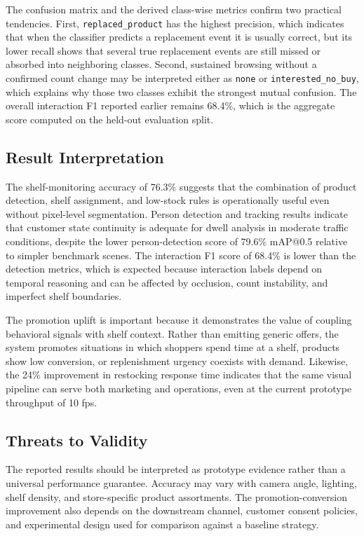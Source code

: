 \documentclass[conference]{IEEEtran}
\begin{document}
The confusion matrix and the derived class-wise metrics confirm two practical tendencies. First, \texttt{replaced\_product} has the highest precision, which indicates that when the classifier predicts a replacement event it is usually correct, but its lower recall shows that several true replacement events are still missed or absorbed into neighboring classes. Second, sustained browsing without a confirmed count change may be interpreted either as \texttt{none} or \texttt{interested\_no\_buy}, which explains why those two classes exhibit the strongest mutual confusion. The overall interaction F1 reported earlier remains 68.4\%, which is the aggregate score computed on the held-out evaluation split.

\subsection{Result Interpretation}

The shelf-monitoring accuracy of 76.3\% suggests that the combination of product detection, shelf assignment, and low-stock rules is operationally useful even without pixel-level segmentation. Person detection and tracking results indicate that customer state continuity is adequate for dwell analysis in moderate traffic conditions, despite the lower person-detection score of 79.6\% mAP@0.5 relative to simpler benchmark scenes. The interaction F1 score of 68.4\% is lower than the detection metrics, which is expected because interaction labels depend on temporal reasoning and can be affected by occlusion, count instability, and imperfect shelf boundaries.

The promotion uplift is important because it demonstrates the value of coupling behavioral signals with shelf context. Rather than emitting generic offers, the system promotes situations in which shoppers spend time at a shelf, products show low conversion, or replenishment urgency coexists with demand. Likewise, the 24\% improvement in restocking response time indicates that the same visual pipeline can serve both marketing and operations, even at the current prototype throughput of 10 fps.

\subsection{Threats to Validity}

The reported results should be interpreted as prototype evidence rather than a universal performance guarantee. Accuracy may vary with camera angle, lighting, shelf density, and store-specific product assortments. The promotion-conversion improvement also depends on the downstream channel, customer consent policies, and experimental design used for comparison against a baseline strategy.
\end{document}
